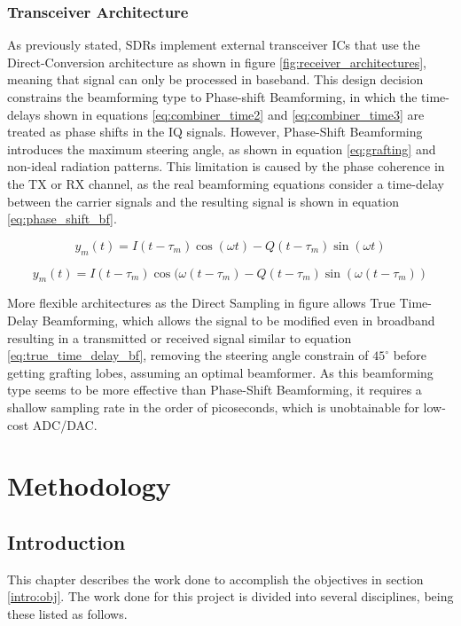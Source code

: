 \documentclass[12pt,a4paper]{report}
\begin{document}
\subsection{Transceiver Architecture} \label{back:bf_sdr:type}
As previously stated, SDRs implement external transceiver ICs that use the Direct-Conversion architecture as shown in figure \ref{fig:receiver_architectures}, meaning that signal can only be processed in baseband. This design decision constrains the beamforming type to Phase-shift Beamforming, in which the time-delays shown in equations \ref{eq:combiner_time2} and \ref{eq:combiner_time3} are treated as phase shifts in the IQ signals. However, Phase-Shift Beamforming introduces the maximum steering angle, as shown in equation \ref{eq:grafting} and non-ideal radiation patterns. This limitation is caused by the phase coherence in the TX or RX channel, as the real beamforming equations consider a time-delay between the carrier signals and the resulting signal is shown in equation \ref{eq:phase_shift_bf}. \cite{Jang2018ABeamformer}

\begin{equation}
    y_m(t) = I(t-\tau_m) \cos(\omega t) - Q(t-\tau_m) \sin(\omega t)
    \label{eq:phase_shift_bf}
\end{equation}

\begin{equation}
    y_m(t) = I(t-\tau_m) \cos(\omega (t - \tau_m) - Q(t-\tau_m) \sin(\omega (t - \tau_m))
    \label{eq:true_time_delay_bf}
\end{equation}

More flexible architectures as the Direct Sampling in figure allows True Time-Delay Beamforming, which allows the signal to be modified even in broadband resulting in a transmitted or received signal similar to equation \ref{eq:true_time_delay_bf}, removing the steering angle constrain of $45^\circ$ before getting grafting lobes, assuming an optimal beamformer. As this beamforming type seems to be more effective than Phase-Shift Beamforming, it requires a shallow sampling rate in the order of picoseconds, which is unobtainable for low-cost ADC/DAC. 


\chapter{Methodology} \label{met}
\section{Introduction} \label{met:intro}
This chapter describes the work done to accomplish the objectives in section \ref{intro:obj}. The work done for this project is divided into several disciplines, being these listed as follows.
\end{document}
